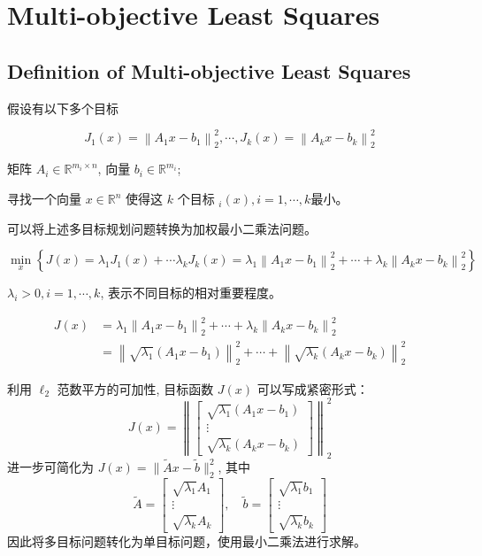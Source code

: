 \chapter{Multi-objective Least Squares}

\section{Definition of Multi-objective Least Squares}

\begin{problem}
    假设有以下多个目标

$$
J_{1}(x)=\left\|A_{1} x-b_{1}\right\|_{2}^{2}, \cdots, J_{k}(x)=\left\|A_{k} x-b_{k}\right\|_{2}^{2}
$$

矩阵 $ A_{i} \in \mathbb{R}^{m_{i} \times n} $, 向量 $ b_{i} \in \mathbb{R}^{m_{i}} $;

寻找一个向量 $ x \in \mathbb{R}^{n} $ 使得这 $ k $ 个目标 $ _{i}(x), i=1, \cdots, k $最小。
\end{problem}

可以将上述多目标规划问题转换为加权最小二乘法问题。

\begin{problem}[加权最小二乘法问题]
    $$
\min _{x}\left\{J(x)=\lambda_{1} J_{1}(x)+\cdots \lambda_{k} J_{k}(x)=\lambda_{1}\left\|A_{1} x-b_{1}\right\|_{2}^{2}+\cdots+\lambda_{k}\left\|A_{k} x-b_{k}\right\|_{2}^{2}\right\}
$$

$ \lambda_{i}>0, i=1, \cdots, k $, 表示不同目标的相对重要程度。

$$
\begin{aligned}
J(x)&=\lambda_{1}\left\|A_{1} x-b_{1}\right\|_{2}^{2}+\cdots+\lambda_{k}\left\|A_{k} x-b_{k}\right\|_{2}^{2} \\
&=\left\|\sqrt{\lambda_{1}}\left(A_{1} x-b_{1}\right)\right\|_{2}^{2}+\cdots+\left\|\sqrt{\lambda_{k}}\left(A_{k} x-b_{k}\right)\right\|_{2}^{2}
\end{aligned}
$$
\end{problem}

利用 $ \ell_{2} $ 范数平方的可加性, 目标函数 $ J(x) $ 可以写成紧密形式：
$$
J(x)=\left\|\left[\begin{array}{c}
\sqrt{\lambda_{1}}\left(A_{1} x-b_{1}\right) \\
\vdots \\
\sqrt{\lambda_{k}}\left(A_{k} x-b_{k}\right)
\end{array}\right]\right\|_{2}^{2}
$$
进一步可简化为 $ J(x)=\|\tilde{A} x-\tilde{b}\|_{2}^{2} $, 其中
$$
\tilde{A}=\left[\begin{array}{c}
\sqrt{\lambda_{1}} A_{1} \\
\vdots \\
\sqrt{\lambda_{k}} A_{k}
\end{array}\right], \quad \tilde{b}=\left[\begin{array}{c}
\sqrt{\lambda_{1}} b_{1} \\
\vdots \\
\sqrt{\lambda_{k}} b_{k}
\end{array}\right]
$$
因此将多目标问题转化为单目标问题，使用最小二乘法进行求解。

